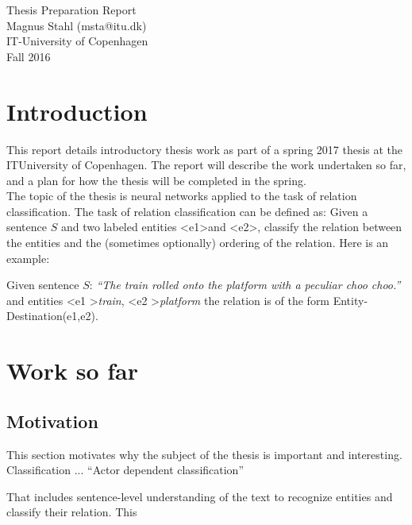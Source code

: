\documentclass{article}
\begin{document}
\begin{center}
    \vspace{2cm}
    \huge { Thesis Preparation Report \\ }
    \vspace{2cm}
    \large {Magnus Stahl (msta@itu.dk)\\
    IT-University of Copenhagen\\
    Fall 2016}
\end{center}


\section{Introduction}
 
This report details introductory thesis work as part of a spring 2017 thesis at the ITUniversity of Copenhagen. The report will describe the work undertaken so far, and a plan for how the thesis will be completed in the spring. \\

The topic of the thesis is neural networks applied to the task of relation classification. The task of relation classification can be defined as:
Given a sentence $S$ and two labeled entities \textless e1\textgreater  and \textless e2\textgreater , classify the relation between the entities and the (sometimes optionally) ordering of the relation. Here is an example:

Given sentence $S$: \emph{``The train rolled onto the platform with a peculiar choo choo.''}
and entities \textless e1 \textgreater \emph{train}, \textless e2 \textgreater \emph{platform} the relation is of the form Entity-Destination(e1,e2).





\section{Work so far}

\subsection{Motivation}

This section motivates why the subject of the thesis is important and interesting.\\


Classification ... ``Actor dependent classification''

That includes sentence-level understanding of the text to recognize entities and classify their relation. This 
\end{document}
